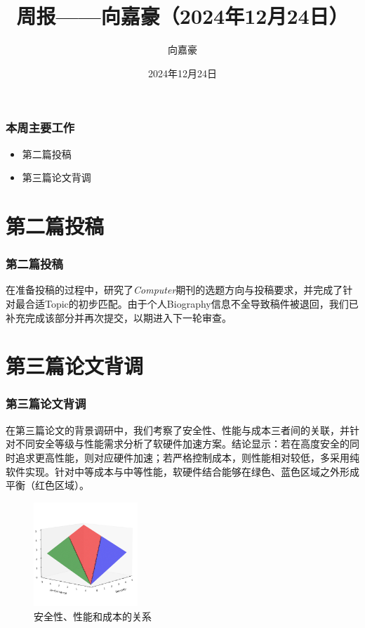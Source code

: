 \documentclass{beamer}
\title{\textbf{周报——向嘉豪（2024年12月24日）}}
\author{向嘉豪}
\institute{衡阳师范学院}
\date{2024年12月24日}
\begin{document}
\begin{frame}
    \titlepage
\end{frame}

\begin{frame}
    \frametitle{本周主要工作}
    \begin{block}{}
        \begin{itemize}
            \item 第二篇投稿
            \item 第三篇论文背调
        \end{itemize} 
    \end{block}
\end{frame}


\section{第二篇投稿}

\begin{frame}
    \frametitle{第二篇投稿}
    \begin{block}{}
        在准备投稿的过程中，研究了\textit{Computer}期刊的选题方向与投稿要求，并完成了针对最合适Topic的初步匹配。由于个人Biography信息不全导致稿件被退回，我们已补充完成该部分并再次提交，以期进入下一轮审查。
    \end{block}
\end{frame}

\section{第三篇论文背调}

\begin{frame}
    \frametitle{第三篇论文背调}
    \begin{block}{}
        在第三篇论文的背景调研中，我们考察了安全性、性能与成本三者间的关联，并针对不同安全等级与性能需求分析了软硬件加速方案。结论显示：若在高度安全的同时追求更高性能，则对应硬件加速；若严格控制成本，则性能相对较低，多采用纯软件实现。针对中等成本与中等性能，软硬件结合能够在绿色、蓝色区域之外形成平衡（红色区域）。
    \end{block}
    \begin{figure}[h]
        \centering
        \includegraphics[width=0.35\textwidth]{./fig/SPC_relation.png}
        \caption{安全性、性能和成本的关系}
    \end{figure}
\end{frame}
\end{document}
